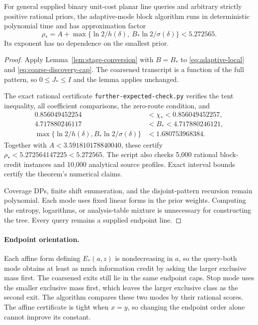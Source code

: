 \begin{theorem}
\label{thm:poly-adaptive-expected}
For general supplied binary unit-cost planar line queries and arbitrary
strictly positive rational priors, the adaptive-mode block algorithm
runs in deterministic polynomial time and has approximation factor
\[
 \boxed{\rho_*=
 A+\max\{\ln2/h(\delta),\ B_*\ln2/\sigma(\delta)\}<5.272565.}
\]
Its exponent has no dependence on the smallest prior.
\end{theorem}
\begin{proof}
Apply Lemma~\ref{lem:stage-conversion} with $B=B_*$ to
\eqref{eq:adaptive-local} and \eqref{eq:coarse-discovery-cap}.
The coarsened transcript is a function of the full pattern, so
$0\le J_*\le I$ and the lemma applies unchanged.

The exact rational certificate \texttt{further-expected-check.py}
verifies the tent inequality, all coefficient comparisons, the
zero-route condition, and
\[
 \begin{aligned}
 0.856049452254&<\chi_*<0.856049452257,\\
 4.717880246117&<B_*<4.717880246121,\\
 \max\{\ln2/h(\delta),B_*\ln2/\sigma(\delta)\}
 &<1.680753968384.
 \end{aligned}
\]
Together with $A<3.591810178840040$, these certify
$\rho_*<5.272564147225<5.272565$.
The script also checks 5,000 rational block-credit instances and
10,000 analytical source profiles. Exact interval bounds certify the
theorem's numerical claims.

Coverage DPs, finite shift enumeration, and the disjoint-pattern
recursion remain polynomial. Each mode uses fixed linear forms in the
prior weights. Computing the entropy, logarithms, or
analysis-table mixture is unnecessary for constructing the tree.
Every query remains a supplied endpoint line.
\end{proof}

\paragraph{Endpoint orientation.}
Each affine form defining $E_*(a,z)$ is nondecreasing in $a$, so the
query-both mode obtains at least as much information credit by asking
the larger exclusive mass first. The coarsened exits still lie in the
same endpoint caps. Stop mode uses the smaller exclusive mass first,
which leaves the larger exclusive class as the second exit. The
algorithm compares these two modes by their rational scores. The
affine certificate is tight when $x=y$, so changing the endpoint order
alone cannot improve its constant.

